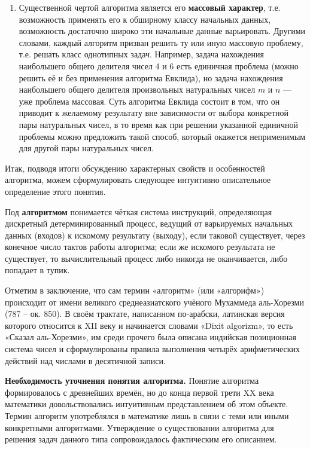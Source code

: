 \documentclass[a4paper,12pt]{article}
\begin{document}
\begin{enumerate}
    \item Существенной чертой алгоритма является его \textbf{массовый характер}, т.е. возможность применять его к обширному классу начальных данных, возможность достаточно широко эти начальные данные варьировать. Другими словами, каждый алгоритм призван решить ту или иную массовую проблему, т.е. решать класс однотипных задач. Например, задача нахождения наибольшего общего делителя чисел 4 и 6 есть единичная проблема (можно решить её и без применения алгоритма Евклида), но задача нахождения наибольшего общего делителя произвольных натуральных чисел \(m\) и \(n\) --- уже проблема массовая. Суть алгоритма Евклида состоит в том, что он приводит к желаемому результату вне зависимости от выбора конкретной пары натуральных чисел, в то время как при решении указанной единичной проблемы можно предложить такой способ, который окажется неприменимым для другой пары натуральных чисел.
\end{enumerate}

Итак, подводя итоги обсуждению характерных свойств и особенностей алгоритма, можем сформулировать следующее интуитивно описательное определение этого понятия.

Под \textbf{алгоритмом} понимается чёткая система инструкций, определяющая дискретный детерминированный процесс, ведущий от варьируемых начальных данных (входов) к искомому результату (выходу), если таковой существует, через конечное число тактов работы алгоритма; если же искомого результата не существует, то вычислительный процесс либо никогда не оканчивается, либо попадает в тупик.

Отметим в заключение, что сам термин «алгоритм» (или «алгорифм») происходит от имени великого среднеазиатского учёного Мухаммеда аль-Хорезми (787 -- ок. 850). В своём трактате, написанном по-арабски, латинская версия которого относится к XII веку и начинается словами «Dixit algorizm», то есть «Сказал аль-Хорезми», им среди прочего была описана индийская позиционная система чисел и сформулированы правила выполнения четырёх арифметических действий над числами в десятичной записи.

\textbf{Необходимость уточнения понятия алгоритма.} Понятие алгоритма формировалось с древнейших времён, но до конца первой трети XX века математики довольствовались интуитивным представлением об этом объекте. Термин алгоритм употреблялся в математике лишь в связи с теми или иными конкретными алгоритмами. Утверждение о существовании алгоритма для решения задач данного типа сопровождалось фактическим его описанием.
\end{document}
